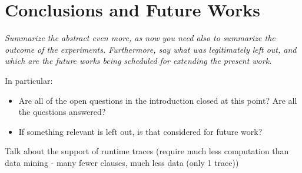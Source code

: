 \section{Conclusions and Future Works}
\textit{Summarize the abstract even more, as now you need also to summarize the outcome of the experiments. Furthermore, say what was legitimately left out, and which are the future works being scheduled for extending the present work.}

In particular:
\begin{itemize}
	\item Are all of the open questions in the introduction closed at this point? Are all the questions answered? 
	\item If something relevant is left out, is that considered for future work?
\end{itemize}

Talk about the support of runtime traces (require much less computation than data mining - many fewer clauses, much less data (only 1 trace))